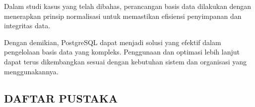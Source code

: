 \documentclass[12pt,a4paper]{article}
\begin{document}
Dalam studi kasus yang telah dibahas, perancangan basis data dilakukan
dengan menerapkan prinsip normalisasi untuk memastikan efisiensi
penyimpanan dan integritas data.

Dengan demikian, PostgreSQL dapat menjadi solusi yang efektif dalam 
pengelolaan basis data yang kompleks. Penggunaan dan optimasi lebih
lanjut dapat terus dikembangkan sesuai dengan kebutuhan sistem dan
organisasi yang menggunakannya.

\newpage 

\begin{center}
  \section*{DAFTAR PUSTAKA}
\end{center}

\setcounter{section}{1}

\setcounter{subsection}{0}





 

  
\end{document}
